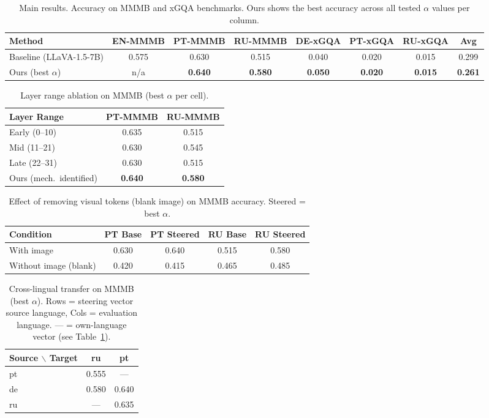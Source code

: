 \begin{table}[t]
\centering
\caption{Main results. Accuracy on MMMB and xGQA benchmarks. Ours shows the best accuracy across all tested $\alpha$ values per column.}
\label{tab:main}
\begin{tabular}{lccccccc}
\toprule
Method & EN-MMMB & PT-MMMB & RU-MMMB & DE-xGQA & PT-xGQA & RU-xGQA & Avg \\
\midrule
Baseline (LLaVA-1.5-7B) & 0.575 & 0.630 & 0.515 & 0.040 & 0.020 & 0.015 & 0.299 \\
Ours (best $\alpha$) & n/a & \textbf{0.640} & \textbf{0.580} & \textbf{0.050} & \textbf{0.020} & \textbf{0.015} & \textbf{0.261} \\
\bottomrule
\end{tabular}
\end{table}

\begin{table}[t]
\centering
\caption{Layer range ablation on MMMB (best $\alpha$ per cell).}
\label{tab:layer_range}
\begin{tabular}{lcc}
\toprule
Layer Range & PT-MMMB & RU-MMMB \\
\midrule
Early (0--10) & 0.635 & 0.515 \\
Mid (11--21) & 0.630 & 0.545 \\
Late (22--31) & 0.630 & 0.515 \\
Ours (mech.\ identified) & \textbf{0.640} & \textbf{0.580} \\
\bottomrule
\end{tabular}
\end{table}

\begin{table}[t]
\centering
\caption{Effect of removing visual tokens (blank image) on MMMB accuracy. Steered = best $\alpha$.}
\label{tab:visual_ablation}
\begin{tabular}{lcccc}
\toprule
Condition & PT Base & PT Steered & RU Base & RU Steered \\
\midrule
With image & 0.630 & 0.640 & 0.515 & 0.580 \\
Without image (blank) & 0.420 & 0.415 & 0.465 & 0.485 \\
\bottomrule
\end{tabular}
\end{table}

\begin{table}[t]
\centering
\caption{Cross-lingual transfer on MMMB (best $\alpha$). Rows = steering vector source language, Cols = evaluation language. --- = own-language vector (see Table~\ref{tab:main}).}
\label{tab:cross_lingual}
\begin{tabular}{lcc}
\toprule
Source $\backslash$ Target & ru & pt \\
\midrule
pt & 0.555 & --- \\
de & 0.580 & 0.640 \\
ru & --- & 0.635 \\
\bottomrule
\end{tabular}
\end{table}

